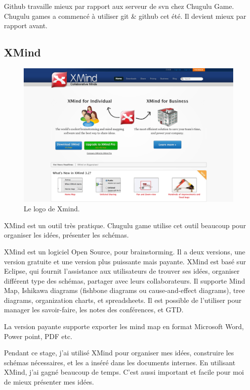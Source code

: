 Github travaille mieux par rapport aux serveur de svn chez Chugulu Game. Chugulu games a commencé à utiliser git \& github cet été. Il devient mieux par rapport avant.


\subsection{XMind} %


\begin{figure}[htbp]
	\centering
		\includegraphics[width=6in]{Image/Xmind.png}
	\caption{Le logo de Xmind.}
	\label{fig:Image_Xmind}
\end{figure}

XMind est un outil très pratique. Chugulu game utilise cet outil beaucoup pour organiser les idées, présenter les schémas. 

XMind est un logiciel Open Source, pour brainstorming. Il a deux versions, une version gratuite et une version plus puissante mais payante. XMind est basé sur Eclipse, qui fournit l'assistance aux utilisateurs de trouver ses idées, organiser différent type des schémas, partager avec leurs collaborateurs. Il supporte Mind Map, Ishikawa diagrams (fishbone diagrams ou cause-and-effect diagrams), tree diagrams, organization charts, et spreadsheets. Il est possible de l'utiliser pour manager les savoir-faire, les notes des conférences, et GTD. 

La version payante supporte exporter les mind map en format Microsoft Word, Power point, PDF etc.

Pendant ce stage, j'ai utilisé XMind pour organiser mes idées, construire les schémas nécessaires, et les a inséré dans les documents internes. En utilisant XMind, j'ai gagné beaucoup de temps. C'est aussi important et facile pour moi de mieux présenter mes idées.

